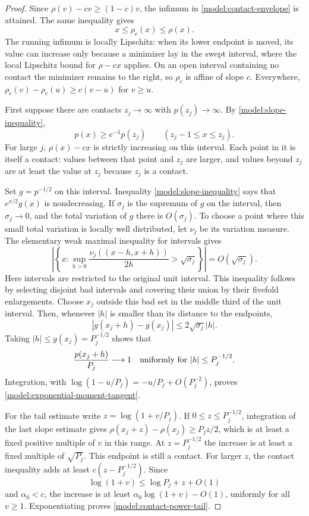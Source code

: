 \begin{proof}
Since \(\rho(v)-cv\ge(1-c)v\), the infimum in
\eqref{model:contact-envelope} is attained.  The same inequality gives
\[
 x\le\rho_c(x)\le\rho(x).
\]
The running infimum is locally Lipschitz: when its lower endpoint is
moved, its value can increase only because a minimizer lay in the swept
interval, where the local Lipschitz bound for \(\rho-cx\) applies.
On an open interval containing no contact the minimizer remains to the
right, so \(\rho_c\) is affine of slope \(c\).  Everywhere,
\(\rho_c(v)-\rho_c(u)\ge c(v-u)\) for \(v\ge u\).

First suppose there are contacts \(z_j\to\infty\) with
\(p(z_j)\to\infty\).  By \eqref{model:slope-inequality},
\[
 p(x)\ge e^{-1}p(z_j)\qquad(z_j-1\le x\le z_j).
\]
For large \(j\), \(\rho(x)-cx\) is strictly increasing on this
interval.  Each point in it is itself a contact: values between that
point and \(z_j\) are larger, and values beyond \(z_j\) are at least
the value at \(z_j\) because \(z_j\) is a contact.

Set \(g=p^{-1/2}\) on this interval.  Inequality
\eqref{model:slope-inequality} says that \(e^{x/2}g(x)\) is
nondecreasing.  If \(\sigma_j\) is the supremum of \(g\) on the interval,
then \(\sigma_j\to0\), and the total variation of \(g\) there is
\(O(\sigma_j)\).  To choose a point where this small total variation
is locally well distributed, let \(\nu_j\) be its variation measure.
The elementary weak maximal inequality for intervals gives
\[
 \left|\left\{x:
 \sup_{h>0}\frac{\nu_j((x-h,x+h))}{2h}>
 \sqrt{\sigma_j}\right\}\right|=O(\sqrt{\sigma_j}).
\]
Here intervals are restricted to the original unit interval.  This
inequality follows by selecting disjoint bad intervals and covering
their union by their fivefold enlargements.  Choose \(x_j\) outside
this bad set in the middle third of the unit interval.  Then, whenever
\(|h|\) is smaller than its distance to the endpoints,
\[
 |g(x_j+h)-g(x_j)|\le
 2\sqrt{\sigma_j}|h|.
\]
Taking \(|h|\le g(x_j)=P_j^{-1/2}\) shows that
\[
 \frac{p(x_j+h)}{P_j}\longrightarrow1
 \quad\hbox{uniformly for }|h|\le P_j^{-1/2}.
\]
Integration, with
\(\log(1-u/P_j)=-u/P_j+O(P_j^{-2})\), proves
\eqref{model:exponential-moment-tangent}.

For the tail estimate write \(z=\log(1+v/P_j)\).  If
\(0\le z\le P_j^{-1/2}\), integration of the last slope estimate gives
\(\rho(x_j+z)-\rho(x_j)\ge P_jz/2\), which is at least a fixed
positive multiple of \(v\) in this range.  At
\(z=P_j^{-1/2}\) the increase is at least a fixed multiple of
\(\sqrt{P_j}\).  This endpoint is still a contact.  For larger \(z\),
the contact inequality adds at least
\(c(z-P_j^{-1/2})\).  Since
\[
 \log(1+v)\le \log P_j+z+O(1)
\]
and \(\alpha_0<c\), the increase is at least
\(\alpha_0\log(1+v)-O(1)\), uniformly for all \(v\ge1\).
Exponentiating proves \eqref{model:contact-power-tail}.


\end{proof}
